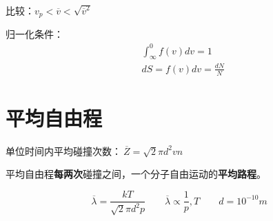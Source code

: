 比较：$v_p<\overline{v}<\sqrt{\overline{v}^2}$

归一化条件：
\begin{equation}
    \begin{aligned}
        & \int^{0}_{\infty}{f(v)dv}=1 \\
        & dS=f(v)dv=\frac{dN}{N}
    \end{aligned}
\end{equation}

\section{平均自由程}

单位时间内平均碰撞次数：$~\overline{Z}=\sqrt{2}\pi{}d^2vn$

平均自由程\textbf{每两次}碰撞之间，一个分子自由运动的\textbf{平均路程}。

\begin{equation}
    \overline{\lambda}=\frac{kT}{\sqrt{2}\pi{}d^2p}\qquad\overline{\lambda{}}\propto\frac{1}{p},T\qquad d=10^{-10}m
\end{equation}

\newpage
